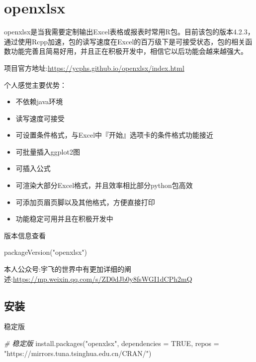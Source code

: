 \documentclass[
]{book}
\newenvironment{Shaded}{\begin{snugshade}}{\end{snugshade}}
\newcommand{\AttributeTok}[1]{\textcolor[rgb]{0.77,0.63,0.00}{#1}}
\newcommand{\CommentTok}[1]{\textcolor[rgb]{0.56,0.35,0.01}{\textit{#1}}}
\newcommand{\ConstantTok}[1]{\textcolor[rgb]{0.00,0.00,0.00}{#1}}
\newcommand{\FunctionTok}[1]{\textcolor[rgb]{0.00,0.00,0.00}{#1}}
\newcommand{\NormalTok}[1]{#1}
\newcommand{\StringTok}[1]{\textcolor[rgb]{0.31,0.60,0.02}{#1}}
\providecommand{\tightlist}{%
  \setlength{\itemsep}{0pt}\setlength{\parskip}{0pt}}
\begin{document}
\hypertarget{data:openxlsx}{%
\section{openxlsx}\label{data:openxlsx}}

openxlsx是当我需要定制输出Excel表格或报表时常用R包。目前该包的版本4.2.3，通过使用Rcpp加速，包的读写速度在Excel的百万级下是可接受状态，包的相关函数功能完善且简易好用，并且正在积极开发中，相信它以后功能会越来越强大。

项目官方地址:\url{https://ycphs.github.io/openxlsx/index.html}

个人感觉主要优势：

\begin{itemize}
\tightlist
\item
  不依赖java环境
\item
  读写速度可接受
\item
  可设置条件格式，与Excel中『开始』选项卡的条件格式功能接近
\item
  可批量插入ggplot2图
\item
  可插入公式
\item
  可渲染大部分Excel格式，并且效率相比部分python包高效
\item
  可添加页眉页脚以及其他格式，方便直接打印
\item
  功能稳定可用并且在积极开发中
\end{itemize}

版本信息查看

\begin{Shaded}
\begin{Highlighting}[]
\FunctionTok{packageVersion}\NormalTok{(}\StringTok{"openxlsx"}\NormalTok{)}
\end{Highlighting}
\end{Shaded}

本人公众号:宇飞的世界中有更加详细的阐述:\url{https://mp.weixin.qq.com/s/ZD0dJb0y8fsWGI1dCPh2mQ}

\hypertarget{ux5b89ux88c5-1}{%
\subsection{安装}\label{ux5b89ux88c5-1}}

稳定版

\begin{Shaded}
\begin{Highlighting}[]
\CommentTok{\# 稳定版}
\FunctionTok{install.packages}\NormalTok{(}\StringTok{"openxlsx"}\NormalTok{, }\AttributeTok{dependencies =} \ConstantTok{TRUE}\NormalTok{, }\AttributeTok{repos =} \StringTok{"https://mirrors.tuna.tsinghua.edu.cn/CRAN/"}\NormalTok{)}
\end{Highlighting}
\end{Shaded}
\end{document}
